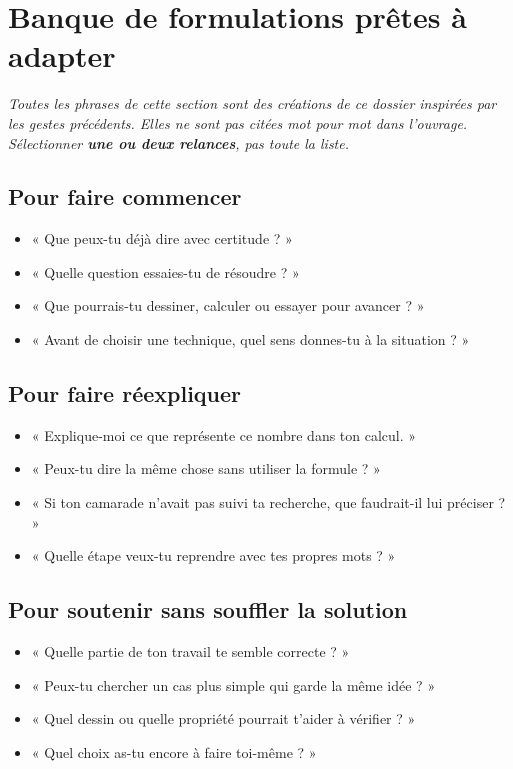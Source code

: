 \documentclass[11pt,a4paper]{article}
\begin{document}
\section{Banque de formulations prêtes à adapter}
\textit{Toutes les phrases de cette section sont des créations de ce dossier inspirées par les gestes précédents. Elles ne sont pas citées mot pour mot dans l'ouvrage. Sélectionner \textbf{une ou deux relances}, pas toute la liste.}
\subsection{Pour faire commencer}
\begin{itemize}
\item « Que peux-tu déjà dire avec certitude ? »
\item « Quelle question essaies-tu de résoudre ? »
\item « Que pourrais-tu dessiner, calculer ou essayer pour avancer ? »
\item « Avant de choisir une technique, quel sens donnes-tu à la situation ? »
\end{itemize}
\subsection{Pour faire réexpliquer}
\begin{itemize}
\item « Explique-moi ce que représente ce nombre dans ton calcul. »
\item « Peux-tu dire la même chose sans utiliser la formule ? »
\item « Si ton camarade n'avait pas suivi ta recherche, que faudrait-il lui préciser ? »
\item « Quelle étape veux-tu reprendre avec tes propres mots ? »
\end{itemize}
\subsection{Pour soutenir sans souffler la solution}
\begin{itemize}
\item « Quelle partie de ton travail te semble correcte ? »
\item « Peux-tu chercher un cas plus simple qui garde la même idée ? »
\item « Quel dessin ou quelle propriété pourrait t'aider à vérifier ? »
\item « Quel choix as-tu encore à faire toi-même ? »
\end{itemize}
\end{document}
